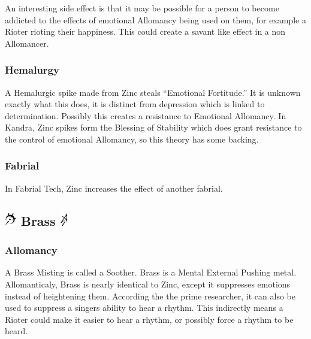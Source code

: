 \documentclass[conference]{IEEEtran}
\newcommand{\n}{\hfill\break}
\begin{document}
An interesting side effect is that it may be possible for a person to become addicted to the effects of emotional Allomancy being used on them, for example a Rioter rioting their happiness.  This could create a savant like effect in a non Allomancer. \\
\subsubsection*{\textbf{Hemalurgy}}
A Hemalurgic spike made from Zinc steals ``Emotional Fortitude.''\cite{HE-TB} It is unknown exactly what this does, it is distinct from depression which is linked to determination. \cite{ARS}  Possibly this creates a resistance to Emotional Allomancy.  In Kandra, Zinc spikes form the Blessing of Stability\cite{Bless-stable} which does grant resistance to the control of emotional Allomancy,\cite{WoA-CH54}\cite{WoA-CH40} so this theory has some backing.\\
\subsubsection*{\textbf{Fabrial}}
In Fabrial Tech, Zinc increases the effect of another fabrial.\cite{RoW-E7}
\n
\subsection*{\includegraphics[height=1em]{images/Brass.png}  \textbf{Brass} \includegraphics[height=1em]{images/Brass_(Feruchemy).png}}
\subsubsection*{\textbf{Allomancy}}
A Brass Misting is called a Soother.\cite{ARS}  Brass is a Mental External Pushing metal.\cite{AL-TB}  Allomanticaly, Brass is nearly identical to Zinc, except it suppresses emotions instead of heightening them.\cite{ARS}
According the the prime researcher, it can also be used to suppress a singers ability to hear a rhythm.\cite{soothe-rythem}  This indirectly means a Rioter could make it easier to hear a rhythm, or possibly force a rhythm to be heard.\\
\end{document}
